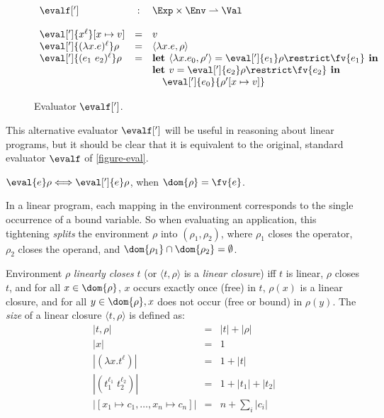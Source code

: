 \begin{figure}
\begin{displaymath}
\begin{array}{lcl}
\evalf['] & : & \Exp \times \Env \rightharpoonup \Val\\
\\
\eval[']{x^\ell}[x \mapsto v]   & = & v\\
\eval[']{(\lambda x.e)^\ell}\rho & = & \langle\lambda x.e,\rho\rangle \\
\eval[']{(e_1\ e_2)^\ell}\rho & = &
       \mbox{\bf let }\langle\lambda x.e_0,\rho'\rangle = 
                      \eval[']{e_1}\rho\restrict\fv{e_1}\mbox{\bf\ in }\\
\ &\ & \mbox{\bf let }v = 
                      \eval[']{e_2}\rho\restrict\fv{e_2}\mbox{\bf\ in }\\
\ &\ &   \quad   \eval[']{e_0}{\rho'[x \mapsto v]}
\end{array}
\end{displaymath}
\caption{Evaluator $\evalf[']$.}
\label{figure-eval-alt}
\end{figure}



This alternative evaluator $\evalf[']$ will be useful in reasoning
about linear programs, but it should be clear that it is equivalent to
the original, standard evaluator $\evalf$ of \autoref{figure-eval}.

\begin{lemma}
$\eval{e}\rho \Longleftrightarrow \eval[']{e}\rho$, when $\dom{\rho} = \fv{e}$.
\end{lemma}

In a linear program, each mapping in the environment corresponds to
the single occurrence of a bound variable.  So when evaluating an
application, this tightening {\em splits} the environment $\rho$ into
$(\rho_1,\rho_2)$, where $\rho_1$ closes the operator, $\rho_2$ closes
the operand, and $\dom{\rho_1} \cap \dom{\rho_2} = \emptyset$.

\begin{definition}
Environment $\rho$ {\em linearly closes} $t$ (or $\langle
t,\rho\rangle$ is a {\em linear closure}) iff $t$ is linear, $\rho$
closes $t$, and for all $x\in\dom{\rho}$, $x$ occurs exactly once
(free) in $t$, $\rho(x)$ is a linear closure, and for all
$y\in\dom{\rho}, x$ does not occur (free or bound) in $\rho(y)$. The
{\em size} of a linear closure $\langle t,\rho\rangle$ is defined as:
\begin{eqnarray*}
|t,\rho| & = & |t|+|\rho|\\
|x| & = & 1\\
|(\lambda x.t^\ell)| & = & 1+|t|\\
|(t_1^{\ell_1}\; t_2^{\ell_2})| & = & 1+|t_1|+|t_2|\\
|[x_1\mapsto c_1,\dots,x_n\mapsto c_n]| & = & n+\sum_i |c_i|
\end{eqnarray*}
\end{definition}

